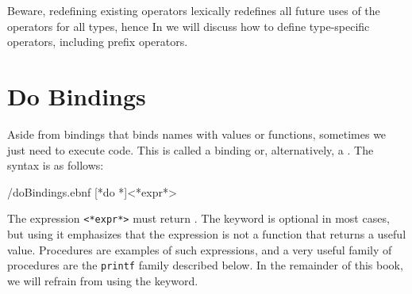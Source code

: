 Beware, redefining existing operators lexically redefines all future uses of the operators for all types, hence  In  we will discuss how to define type-specific operators, including prefix operators. 

\section{Do Bindings}
Aside from  bindings that binds names with values or functions, sometimes we just need to execute code. This is called a  binding or, alternatively, a . The syntax is as follows:
%
\begin{verbatimwrite}{\ebnf/doBindings.ebnf}
[*do *]<*expr*>
\end{verbatimwrite}
%
The expression \lstinline[language=syntax]{<*expr*>} must return . The keyword  is optional in most cases, but using it emphasizes that the expression is not a function that returns a useful value. Procedures are examples of such expressions, and a very useful family of procedures are the \lstinline{printf} family described below. In the remainder of this book, we will refrain from using the  keyword.

